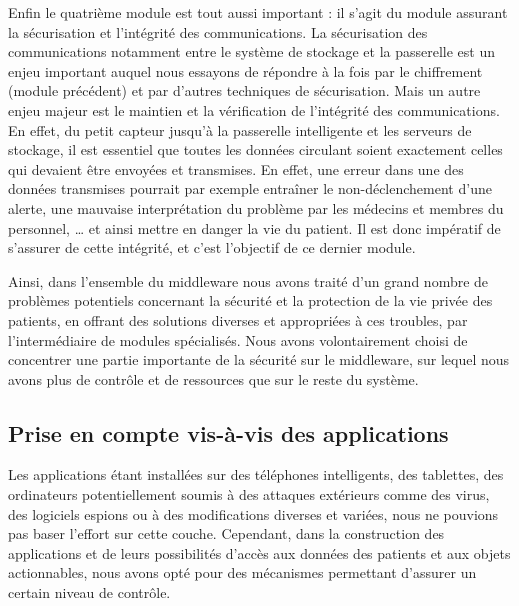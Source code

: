 Enfin le quatrième module est tout aussi important : il s’agit du module assurant la sécurisation et l’intégrité des communications. La sécurisation des communications notamment entre le système de stockage et la passerelle est un enjeu important auquel nous essayons de répondre à la fois par le chiffrement (module précédent) et par d’autres techniques de sécurisation. Mais un autre enjeu majeur est le maintien et la vérification de l’intégrité des communications. En effet, du petit capteur jusqu’à la passerelle intelligente et les serveurs de stockage, il est essentiel que toutes les données circulant soient exactement celles qui devaient être envoyées et transmises. En effet, une erreur dans une des données transmises pourrait par exemple entraîner le non-déclenchement d’une alerte, une mauvaise interprétation du problème par les médecins et membres du personnel, … et ainsi mettre en danger la vie du patient. Il est donc impératif de s’assurer de cette intégrité, et c’est l’objectif de ce dernier module.

Ainsi, dans l’ensemble du middleware nous avons traité d’un grand nombre de problèmes potentiels concernant la sécurité et la protection de la vie privée des patients, en offrant des solutions diverses et appropriées à ces troubles, par l’intermédiaire de modules spécialisés. Nous avons volontairement choisi de concentrer une partie importante de la sécurité sur le middleware, sur lequel nous avons plus de contrôle et de ressources que sur le reste du système.
 
\subsection{Prise en compte vis-à-vis des applications}

Les applications étant installées sur des téléphones intelligents, des tablettes, des ordinateurs potentiellement soumis à des attaques extérieurs comme des virus, des logiciels espions ou à des modifications diverses et variées, nous ne pouvions pas baser l’effort sur cette couche. Cependant, dans la construction des applications et de leurs possibilités d’accès aux données des patients et aux objets actionnables, nous avons opté pour des mécanismes permettant d’assurer un certain niveau de contrôle.

